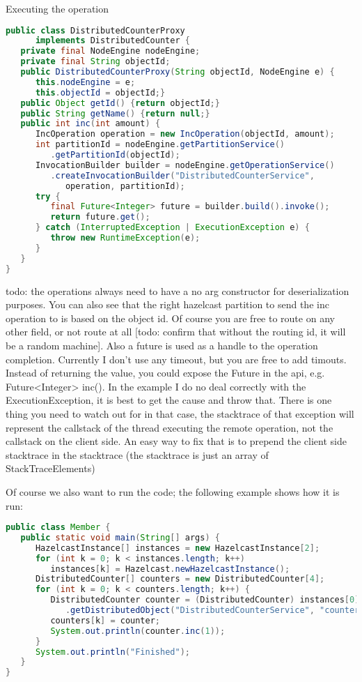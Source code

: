 Executing the operation
\begin{lstlisting}[language=java]
public class DistributedCounterProxy 
      implements DistributedCounter {
   private final NodeEngine nodeEngine;
   private final String objectId;
   public DistributedCounterProxy(String objectId, NodeEngine e) {
      this.nodeEngine = e;
      this.objectId = objectId;}
   public Object getId() {return objectId;}
   public String getName() {return null;}
   public int inc(int amount) {
      IncOperation operation = new IncOperation(objectId, amount);
      int partitionId = nodeEngine.getPartitionService()
         .getPartitionId(objectId);
      InvocationBuilder builder = nodeEngine.getOperationService()
         .createInvocationBuilder("DistributedCounterService", 
            operation, partitionId);
      try {
         final Future<Integer> future = builder.build().invoke();
         return future.get();
      } catch (InterruptedException | ExecutionException e) {
         throw new RuntimeException(e);
      }
   }
}
\end{lstlisting}
todo: the operations always need to have a no arg constructor for deserialization purposes. You can also see that the right hazelcast partition to send the inc operation to is based on the object id. Of course you are free to route on any other field, or not route at all [todo: confirm that without the routing id, it will be a random machine]. Also a future is used as a handle to the operation completion. Currently I don't use any timeout, but you are free to add timouts. Instead of returning the value, you could expose the Future in the api, e.g. Future<Integer> inc(). In the example I do no deal correctly with the ExecutionException, it is best to get the cause and throw that. There is one thing you need to watch out for in that case, the stacktrace of that exception will represent the callstack of the thread executing the remote operation, not the callstack on the client side. An easy way to fix that is to prepend  the client side stacktrace in the stacktrace (the stacktrace is just an array of StackTraceElements)

Of course we also want to run the code; the following example shows how it is run:
\begin{lstlisting}[language=java]
public class Member {
   public static void main(String[] args) {
      HazelcastInstance[] instances = new HazelcastInstance[2];
      for (int k = 0; k < instances.length; k++) 
         instances[k] = Hazelcast.newHazelcastInstance();
      DistributedCounter[] counters = new DistributedCounter[4];
      for (int k = 0; k < counters.length; k++) {
         DistributedCounter counter = (DistributedCounter) instances[0]
            .getDistributedObject("DistributedCounterService", "counter" + k);
         counters[k] = counter;
         System.out.println(counter.inc(1));
      }
      System.out.println("Finished");
   }
}
\end{lstlisting}

